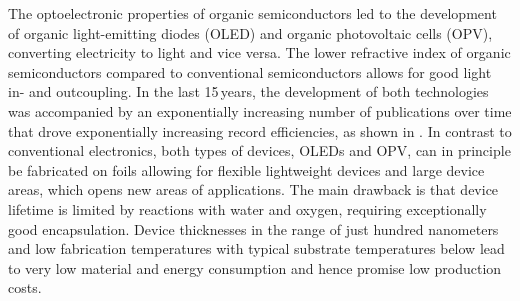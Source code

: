 The optoelectronic properties of organic semiconductors led to the development of organic light-emitting diodes (OLED) and organic photovoltaic cells (OPV), converting electricity to light and vice versa. The lower refractive index of organic semiconductors compared to conventional semiconductors allows for good light in- and outcoupling. In the last 15\,years, the development of both technologies was accompanied by an exponentially increasing number of publications over time that drove exponentially increasing record efficiencies, as shown in .
In contrast to conventional electronics, both types of devices, OLEDs and OPV, can in principle be fabricated on foils allowing for flexible lightweight devices and large device areas, which opens new areas of applications.
The main drawback is that device lifetime is limited by reactions with water and oxygen, requiring exceptionally good encapsulation.
Device thicknesses in the range of just hundred nanometers and low fabrication temperatures with typical substrate temperatures below  lead to very low material and energy consumption and hence promise low production costs.

